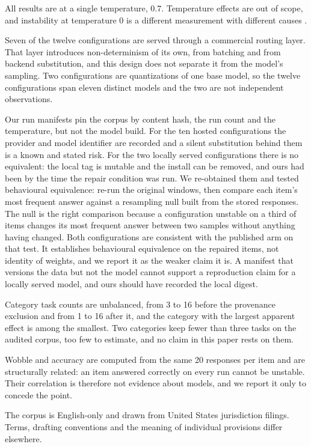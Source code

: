 \documentclass[11pt]{article}
\begin{document}
All results are at a single temperature, 0.7. Temperature effects are out of scope, and instability
at temperature 0 is a different measurement with different causes \citep{atil-etal-2025-non}.

Seven of the twelve configurations are served through a commercial routing layer. That layer
introduces non-determinism of its own, from batching and from backend substitution, and this design
does not separate it from the model's sampling. Two configurations are quantizations of one base
model, so the twelve
configurations span eleven distinct models and the two are not independent observations.

Our run manifests pin the corpus by content hash, the run count and the temperature, but not the
model build. For the ten hosted configurations the provider and model identifier are recorded and a
silent substitution behind them is a known and stated risk. For the two locally served
configurations there is no equivalent: the local tag is mutable and the install can be removed, and
ours had been by the time the repair condition was run. We re-obtained them and tested behavioural
equivalence: re-run the original windows, then compare each item's most frequent answer against a
resampling null built from the stored responses. The null is the right comparison because a
configuration unstable on a third of items changes its most frequent answer between two samples
without anything having changed. Both configurations are consistent with the published arm on that
test. It establishes behavioural equivalence on the repaired items, not identity of weights, and we
report it as the weaker claim it is. A manifest that versions the data but not the model cannot
support a reproduction claim for a locally served model, and ours should have recorded the local
digest.

Category task counts are unbalanced, from 3 to 16 before the provenance exclusion and from 1 to 16
after it, and the category with the largest apparent effect is among the smallest. Two categories
keep fewer than three tasks on the audited corpus, too few to estimate, and no claim in this paper
rests on them.

Wobble and accuracy are computed from the same 20 responses per item and are structurally related:
an item answered correctly on every run cannot be unstable. Their correlation is therefore not
evidence about models, and we report it only to concede the point.

The corpus is English-only and drawn from United States jurisdiction filings. Terms, drafting
conventions and the meaning of individual provisions differ elsewhere.
\end{document}
